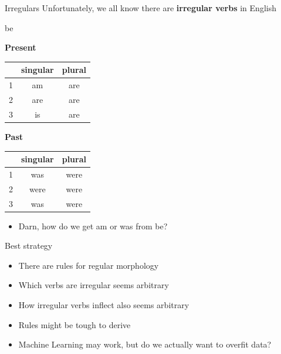 \documentclass[10pt, compress]{beamer}
\begin{document}
\begin{frame}{Irregulars}
	Unfortunately, we all know there are {\bf irregular verbs} in English

	\begin{table}
		{\sc be} \\
		\begin{multicols}{2}

			{\bf Present}	\\
			\begin{tabular}{|r|cc|}
				\toprule
					&	singular	&	plural	\\
				\midrule
				1	&	am 	&	are 	\\	
				2	&	are 	&	are 	\\
				3	&	is &	are 	\\
				\bottomrule
			\end{tabular}

			{\bf Past}	\\
			\begin{tabular}{|r|cc|}
				\toprule
					&	singular	&	plural	\\
				\midrule
				1	&	was 	&	were 	\\	
				2	&	were 	&	were 	\\
				3	&	was &	were 	\\
				\bottomrule
			\end{tabular}
		\end{multicols}
	\end{table}

	\pause

	\begin{itemize}
		\item Darn, how do we get \alert{am} or \alert{was} from \alert{be}?
	\end{itemize}
\end{frame}

\begin{frame}{Best strategy}
	\begin{itemize}
		\item There are rules for regular morphology
		\item Which verbs are irregular seems arbitrary
		\item How irregular verbs inflect also seems arbitrary
		\item Rules might be tough to derive
		\item Machine Learning may work, but do we actually want to overfit data?
	\end{itemize}
\end{frame}
\end{document}
